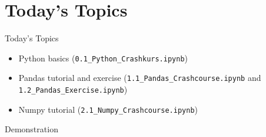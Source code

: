 \documentclass[en,
]{sdqbeamer_standard}
\begin{document}
\section{Today's Topics}
\begin{frame}{Today's Topics}
    \begin{itemize}
        \setlength\itemsep{2em}
        \item Python basics (\texttt{0.1\_Python\_Crashkurs.ipynb})
        \item Pandas tutorial and exercise
            (\texttt{1.1\_Pandas\_Crashcourse.ipynb} and
            \texttt{1.2\_Pandas\_Exercise.ipynb})
        \item Numpy tutorial (\texttt{2.1\_Numpy\_Crashcourse.ipynb})
    \end{itemize}
\end{frame}

\begin{frame}{Demonstration}
    \vfill
\end{frame}


\appendix
\beginbackup


\backupend
\end{document}
